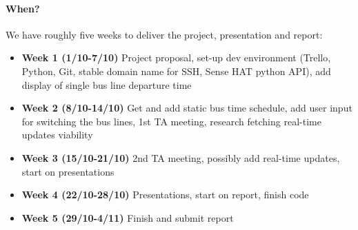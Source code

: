 \documentclass[oneside,a4paper]{paper}
\begin{document}
\paragraph{When?} We have roughly five weeks to deliver the project, presentation and report:

\begin{itemize}
	\item \textbf{Week 1 (1/10-7/10)} Project proposal, set-up dev environment (Trello, Python, Git, stable domain name for SSH, Sense HAT python API), add display of single bus line departure time
	\item \textbf{Week 2 (8/10-14/10)} Get and add static bus time schedule, add user input for switching the bus lines, 1st TA meeting, research fetching real-time updates viability
	\item \textbf{Week 3 (15/10-21/10)} 2nd TA meeting, possibly add real-time updates, start on presentations
	\item \textbf{Week 4 (22/10-28/10)} Presentations, start on report, finish code
	\item \textbf{Week 5 (29/10-4/11)} Finish and submit report
\end{itemize}
\end{document}

